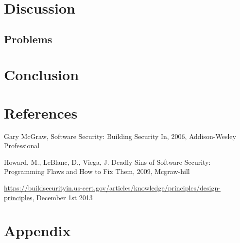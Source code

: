 \documentclass[a4paper]{article}
\begin{document}


\section{Discussion}


\subsection{Problems}


\section{Conclusion}

\newpage
\section{References}
\begin{thebibliography}{9}
Gary McGraw,
Software Security: Building Security In,
2006,
Addison-Wesley Professional 

Howard, M., LeBlanc, D., Viega, J.
Deadly Sins of Software Security: Programming Flaws and How to Fix Them,
2009,
Mcgraw-hill

\href{https://buildsecurityin.us-cert.gov/articles/knowledge/principles/design-principles}{https://buildsecurityin.us-cert.gov/articles/knowledge/principles/design-principles}, December 1st 2013
\end{thebibliography}

\newpage
\section{Appendix}
\end{document}
